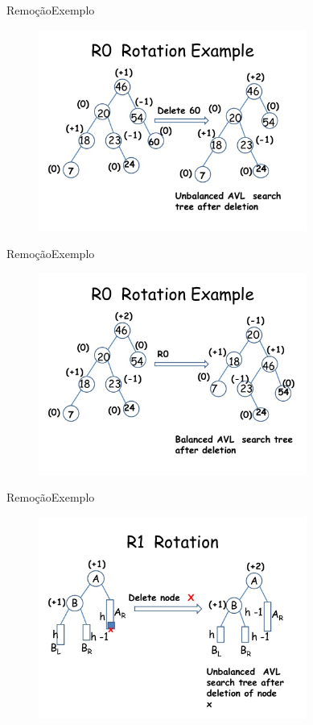 \documentclass[aspectratio=169]{beamer}
\begin{document}

\begin{frame}{Remoção}{Exemplo}
\begin{figure}[!h]
  \centering
  \includegraphics[width=250pt]{imagens/exemplo_remocao3.png}
  \label{fig_exemplo_remocao3}
\end{figure}
\end{frame}



\begin{frame}{Remoção}{Exemplo}
\begin{figure}[!h]
  \centering
  \includegraphics[width=250pt]{imagens/exemplo_remocao4.png}
  \label{fig_exemplo_remocao4}
\end{figure}
\end{frame}



\begin{frame}{Remoção}{Exemplo}
\begin{figure}[!h]
  \centering
  \includegraphics[width=250pt]{imagens/exemplo_remocao5.png}
  \label{fig_exemplo_remocao5}
\end{figure}
\end{frame}
\end{document}
